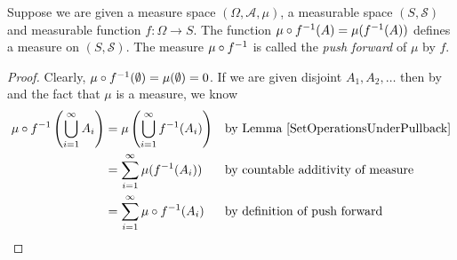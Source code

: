 \begin{lem}\label{PushforwardMeasure}Suppose we are given a measure space $(\Omega, \mathcal{A},
  \mu)$, a measurable space $(S, \mathcal{S})$ and measurable
  function $f : \Omega \to S$.  The function $\mu \circ f^{-1} (A) =
  \mu(f^{-1}(A))$ defines a measure on $(S, \mathcal{S})$.  The
  measure $\mu \circ f^{-1}$ is called the \emph{push forward} of
  $\mu$ by $f$.
\end{lem}
\begin{proof}Clearly, $\mu \circ f^{-1} (\emptyset) = \mu(\emptyset) =
  0$.  
If we are given disjoint $A_1, A_2, \dots$ then by and the fact that $\mu$ is a measure,
we know 
\begin{align*}
\mu \circ f^{-1} \left (\bigcup_{i=1}^\infty A_i \right ) & =
\mu \left (\bigcup_{i=1}^\infty f^{-1}(A_i) \right ) & & \text{by Lemma
\ref{SetOperationsUnderPullback}} \\
& = \sum_{i=1}^\infty \mu (f^{-1}(A_i)) & & \text{by countable
  additivity of measure}\\
&=  \sum_{i=1}^\infty \mu \circ f^{-1} (A_i) & & \text{by
  definition of push forward}
\end{align*}
\end{proof}

